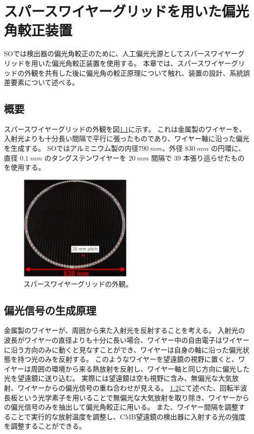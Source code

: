 \documentclass[../../main.tex]{subfiles}
\begin{document}
\chapter{スパースワイヤーグリッドを用いた偏光角較正装置}
SOでは検出器の偏光角較正のために、人工偏光光源としてスパースワイヤーグリッドを用いた偏光角較正装置を使用する。
本章では、スパースワイヤーグリッドの外観を共有した後に偏光角の較正原理について触れ、装置の設計、系統誤差要素について述べる。
\section{概要}
スパースワイヤーグリッドの外観を図\ref{fig:wiregrid_appearance}に示す。
これは金属製のワイヤーを、入射光よりも十分長い間隔で平行に張ったものであり、ワイヤー軸に沿った偏光を生成する。
SOではアルミニウム製の内径$\SI{790}{mm}$、外径 $\SI{830}{mm}$ の円環に、直径 $\SI{0.1}{mm}$ のタングステンワイヤーを $\SI{20}{mm}$ 間隔で $39$ 本張り巡らせたものを使用する。

\begin{figure}[H]
    \centering
    \includegraphics[width=0.5\textwidth]{wiregrid/wiregrid_appearance.pdf}
    \caption[スパースワイヤーグリッドの外観]{スパースワイヤーグリッドの外観\cite{}。}
    \label{fig:wiregrid_appearance}    
\end{figure}
\section{偏光信号の生成原理}
金属製のワイヤーが、周囲から来た入射光を反射することを考える。
入射光の波長がワイヤーの直径よりも十分に長い場合、ワイヤー中の自由電子はワイヤーに沿う方向のみに動くと見なすことができ、ワイヤーは自身の軸に沿った偏光状態を持つ光のみを反射する。
このようなワイヤーを望遠鏡の視野に置くと、ワイヤーは周囲の環境から来る熱放射を反射し、ワイヤー軸と同じ方向に偏光した光を望遠鏡に送り込む。
実際には望遠鏡は空も視野に含み、無偏光な大気放射、ワイヤーからの偏光信号の重ね合わせが見える。
\ref{}にて述べた、回転半波長板という光学素子を用いることで無偏光な大気放射を取り除き、ワイヤーからの偏光信号のみを抽出して偏光角較正に用いる。
また、ワイヤー間隔を調整することで実行的な放射温度を調整し、CMB望遠鏡の検出器に入射する光の強度を調整することができる。
\end{document}
